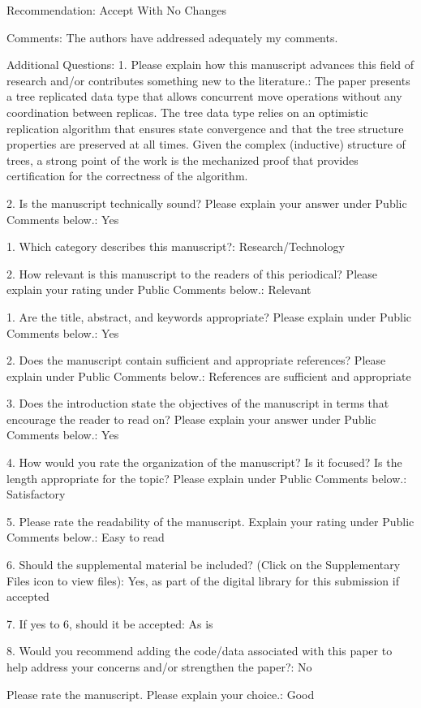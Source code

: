 \documentclass[10pt]{article}
\begin{document}
\begin{spverbatim}
Recommendation: Accept With No Changes

Comments:
The authors have addressed adequately my comments.

Additional Questions:
1.  Please explain how this manuscript advances this field of research and/or contributes something new to the literature.: The paper presents a tree replicated data type that allows concurrent move operations without any coordination between replicas. The tree data type relies on an optimistic replication algorithm that ensures state convergence and that the tree structure properties are preserved at all times. Given the complex (inductive) structure of trees, a strong point of the work is the mechanized proof that provides certification for the correctness of the algorithm.

2. Is the manuscript technically sound? Please explain your answer under Public Comments below.: Yes

1. Which category describes this manuscript?: Research/Technology

2. How relevant is this manuscript to the readers of this periodical? Please explain your rating under Public Comments below.: Relevant

1. Are the title, abstract, and keywords appropriate? Please explain under Public Comments below.: Yes

2. Does the manuscript contain sufficient and appropriate references? Please explain under Public Comments below.: References are sufficient and appropriate

3. Does the introduction state the objectives of the manuscript in terms that encourage the reader to read on? Please explain your answer under Public Comments below.: Yes

4. How would you rate the organization of the manuscript? Is it focused? Is the length appropriate for the topic? Please explain under Public Comments below.: Satisfactory

5. Please rate the readability of the manuscript. Explain your rating under Public Comments below.: Easy to read

6. Should the supplemental material be included? (Click on the Supplementary Files icon to view files): Yes, as part of the digital library for this submission if accepted

7. If yes to 6, should it be accepted: As is

8. Would you recommend adding the code/data associated with this paper to help address your concerns and/or strengthen the paper?: No

Please rate the manuscript. Please explain your choice.: Good
\end{spverbatim}
\end{document}
